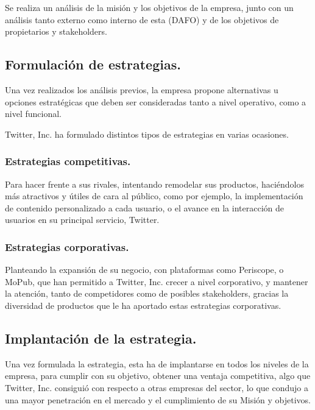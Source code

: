 Se realiza un análisis de la misión y los objetivos de la empresa, junto con un análisis tanto externo como interno de esta (DAFO) y de los objetivos de propietarios y stakeholders.

\subsection{Formulación de estrategias.}

Una vez realizados los análisis previos, la empresa propone alternativas u opciones estratégicas  que deben ser consideradas tanto a nivel operativo, como a nivel funcional.

Twitter, Inc. ha formulado distintos tipos de estrategias en varias ocasiones.

\subsubsection{Estrategias competitivas.}

Para hacer frente a sus rivales, intentando remodelar sus productos, haciéndolos más atractivos y útiles de cara al público, como por ejemplo, la implementación de contenido personalizado a cada usuario, o el avance en la interacción de usuarios en su principal servicio, Twitter.

\subsubsection{Estrategias corporativas.}

Planteando la expansión de su negocio, con plataformas como Periscope, o MoPub, que han permitido a Twitter, Inc. crecer a nivel corporativo, y mantener la atención, tanto de competidores como de posibles stakeholders, gracias la diversidad de productos que le ha aportado estas estrategias corporativas.

\subsection{Implantación de la estrategia.}

Una vez formulada la estrategia, esta ha de implantarse en todos los niveles de la empresa, para cumplir con su objetivo, obtener una ventaja competitiva, algo que Twitter, Inc. consiguió con respecto a otras empresas del sector, lo que condujo a una mayor penetración en el mercado y el cumplimiento de su Misión y objetivos.









